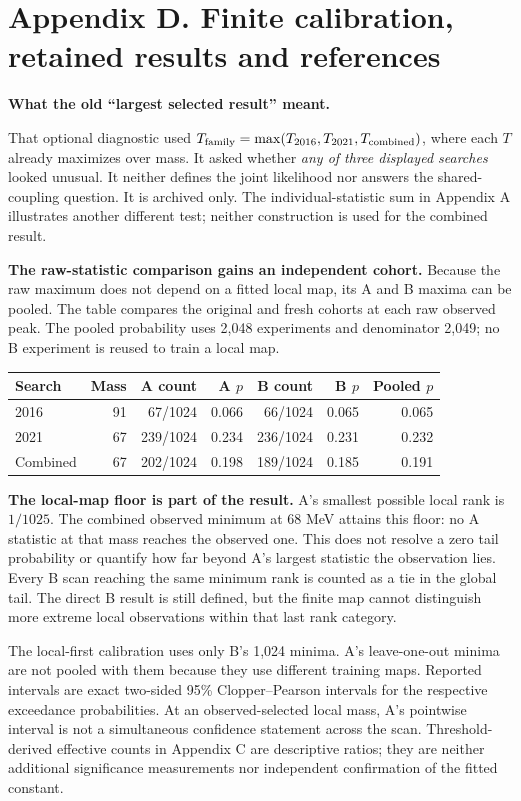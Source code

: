 \documentclass[11pt]{article}
\begin{document}
\clearpage\section*{Appendix D. Finite calibration, retained results and references}

\textbf{What the old ``largest selected result'' meant.}\par
That optional diagnostic used $T_{\rm family}=\max(T_{2016},T_{2021},T_{\rm combined})$, where each $T$ already maximizes over mass. It asked whether \emph{any of three displayed searches} looked unusual. It neither defines the joint likelihood nor answers the shared-coupling question. It is archived only. The individual-statistic sum in Appendix A illustrates another different test; neither construction is used for the combined result.

\textbf{The raw-statistic comparison gains an independent cohort.} Because the raw maximum does not depend on a fitted local map, its A and B maxima can be pooled. The table compares the original and fresh cohorts at each raw observed peak. The pooled probability uses 2,048 experiments and denominator 2,049; no B experiment is reused to train a local map.
\begin{center}\small\setlength{\tabcolsep}{4pt}\begin{tabular}{lrrrrrr}\toprule
Search & Mass & A count & A $p$ & B count & B $p$ & Pooled $p$\\\midrule
2016 & 91 & 67/1024 & 0.066 & 66/1024 & 0.065 & 0.065\\
2021 & 67 & 239/1024 & 0.234 & 236/1024 & 0.231 & 0.232\\
Combined & 67 & 202/1024 & 0.198 & 189/1024 & 0.185 & 0.191\\
\bottomrule\end{tabular}\end{center}

\textbf{The local-map floor is part of the result.} A's smallest possible local rank is $1/1025$. The combined observed minimum at 68 MeV attains this floor: no A statistic at that mass reaches the observed one. This does not resolve a zero tail probability or quantify how far beyond A's largest statistic the observation lies. Every B scan reaching the same minimum rank is counted as a tie in the global tail. The direct B result is still defined, but the finite map cannot distinguish more extreme local observations within that last rank category.

The local-first calibration uses only B's 1,024 minima. A's leave-one-out minima are not pooled with them because they use different training maps. Reported intervals are exact two-sided 95\% Clopper--Pearson intervals for the respective exceedance probabilities. At an observed-selected local mass, A's pointwise interval is not a simultaneous confidence statement across the scan. Threshold-derived effective counts in Appendix C are descriptive ratios; they are neither additional significance measurements nor independent confirmation of the fitted constant.
\end{document}
